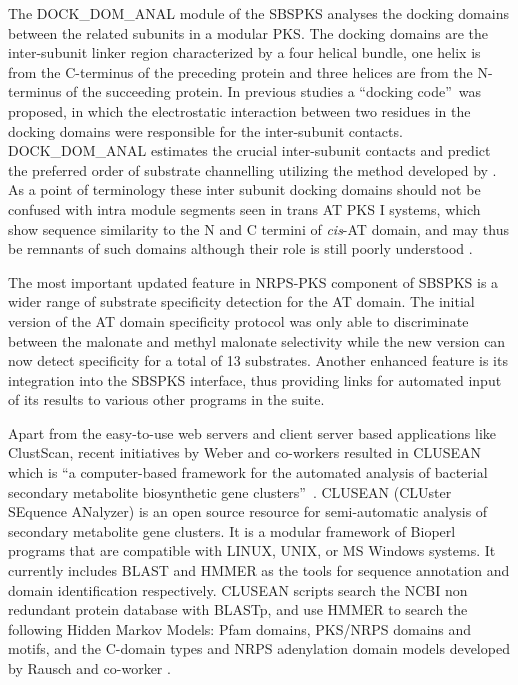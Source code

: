 \begin{doublespacing}
		The DOCK\_DOM\_ANAL module of the SBSPKS analyses the docking domains between the related subunits in a modular PKS. The docking domains are the inter-subunit linker region characterized by a four helical bundle, one helix is from the C-terminus of the preceding protein and three helices are from the N-terminus of the succeeding protein. In previous studies \parencite{Broadhurst2003, Weissman2006, Weissman2008} a \textquotedblleft docking code\textquotedblright \ was proposed, in which the electrostatic interaction between two residues in the docking domains were responsible for the inter-subunit contacts. DOCK\_DOM\_ANAL estimates the crucial inter-subunit contacts and predict the preferred order of substrate channelling utilizing the method developed by \textcite{Yadav2009}. As a point of terminology these inter subunit docking domains should not be confused with intra module segments seen in trans AT PKS I systems, which show sequence similarity to the N and C termini of \textit{cis}-AT domain, and may thus be remnants of such domains although their role is still poorly understood \parencite{Gurney2011}.
		
		The most important updated feature in NRPS-PKS component of SBSPKS is a wider range of substrate specificity detection for the AT domain. The initial version of the AT domain specificity protocol was only able to discriminate between the malonate and methyl malonate selectivity while the new version can now detect specificity for a total of 13 substrates. Another enhanced feature is its integration into the SBSPKS interface, thus providing links for automated input of its results to various other programs in the suite. 
		
		Apart from the easy-to-use web servers and client server based applications like ClustScan, recent initiatives by Weber and co-workers resulted in CLUSEAN which is \textquotedblleft a computer-based framework for the automated analysis of bacterial secondary metabolite biosynthetic gene clusters\textquotedblright \ \parencite{Weber2009}. CLUSEAN (CLUster SEquence ANalyzer) is an open source resource for semi-automatic analysis of secondary metabolite gene clusters. It is a modular framework of Bioperl \parencite{Rausch2007} programs that are compatible with LINUX, UNIX, or MS Windows systems. It currently includes BLAST and HMMER as the tools for sequence annotation and domain identification respectively. CLUSEAN scripts search the NCBI non redundant protein database with BLASTp, and use HMMER to search the following Hidden Markov Models: Pfam domains, PKS/NRPS domains and motifs, and the C-domain types and NRPS adenylation domain models developed by Rausch and co-worker \parencite{Rausch2005, Rausch2007}. %
		

\end{doublespacing}
